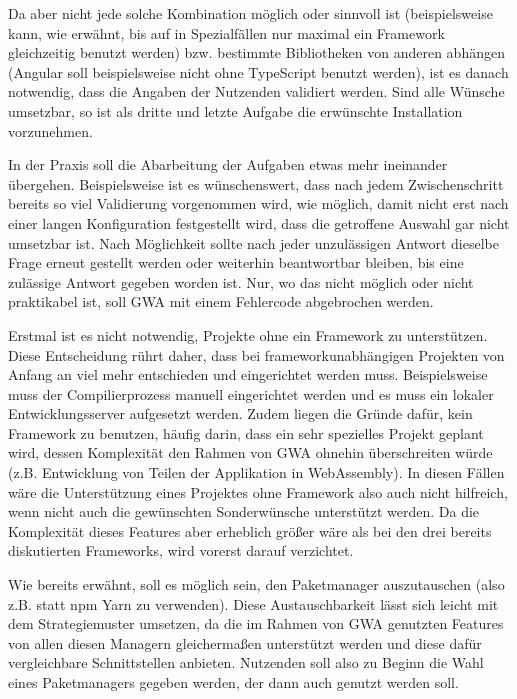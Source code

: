 Da aber nicht jede solche Kombination möglich oder sinnvoll ist (beispielsweise kann, wie erwähnt, bis auf in Spezialfällen nur maximal ein Framework gleichzeitig benutzt werden) bzw. bestimmte Bibliotheken von anderen abhängen (Angular soll beispielsweise nicht ohne TypeScript benutzt werden), ist es danach notwendig, dass die Angaben der Nutzenden validiert werden. Sind alle Wünsche umsetzbar, so ist als dritte und letzte Aufgabe die erwünschte Installation vorzunehmen.

In der Praxis soll die Abarbeitung der Aufgaben etwas mehr ineinander übergehen. Beispielsweise ist es wünschenswert, dass nach jedem Zwischenschritt bereits so viel Validierung vorgenommen wird, wie möglich, damit nicht erst nach einer langen Konfiguration festgestellt wird, dass die getroffene Auswahl gar nicht umsetzbar ist. Nach Möglichkeit sollte nach jeder unzulässigen Antwort dieselbe Frage erneut gestellt werden oder weiterhin beantwortbar bleiben, bis eine zulässige Antwort gegeben worden ist. Nur, wo das nicht möglich oder nicht praktikabel ist, soll \gls{GWA} mit einem Fehlercode abgebrochen werden.

Erstmal ist es nicht notwendig, Projekte ohne ein Framework zu unterstützen. Diese Entscheidung rührt daher, dass bei frameworkunabhängigen Projekten von Anfang an viel mehr entschieden und eingerichtet werden muss. Beispielsweise muss der Compilierprozess manuell eingerichtet werden und es muss ein lokaler Entwicklungsserver aufgesetzt werden. Zudem liegen die Gründe dafür, kein Framework zu benutzen, häufig darin, dass ein sehr spezielles Projekt geplant wird, dessen Komplexität den Rahmen von \gls{GWA} ohnehin überschreiten würde (z.B. Entwicklung von Teilen der Applikation in WebAssembly). In diesen Fällen wäre die Unterstützung eines Projektes ohne Framework also auch nicht hilfreich, wenn nicht auch die gewünschten Sonderwünsche unterstützt werden. Da die Komplexität  dieses Features aber erheblich größer wäre als bei den drei bereits diskutierten Frameworks, wird vorerst darauf verzichtet.

Wie bereits erwähnt, soll es möglich sein, den Paketmanager auszutauschen (also z.B. statt \gls{npm} Yarn zu verwenden). Diese Austauschbarkeit lässt sich leicht mit dem Strategiemuster umsetzen, da die im Rahmen von \gls{GWA} genutzten Features von allen diesen Managern gleichermaßen unterstützt werden und diese dafür vergleichbare Schnittstellen anbieten. Nutzenden soll also zu Beginn die Wahl eines Paketmanagers gegeben werden, der dann auch genutzt werden soll.

